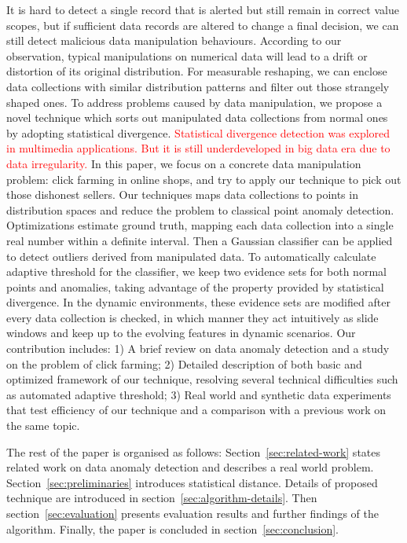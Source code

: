 \documentclass[10pt,conference,letterpaper]{article}
\begin{document}
		It is hard to detect a single record that is alerted but still remain in correct value scopes, but if sufficient data records are altered to change a final decision, we can still detect malicious data manipulation behaviours.
		According to our observation, typical manipulations on numerical data will lead to a drift or distortion of its original distribution. For measurable reshaping, we can enclose data collections with similar distribution patterns and filter out those strangely shaped ones. 
		To address problems caused by data manipulation, we propose a novel technique which sorts out manipulated data collections from normal ones by adopting statistical divergence.
		\textcolor{red}{Statistical divergence detection was explored in multimedia applications. But it is still underdeveloped in big data era due to data irregularity.}
		In this paper, we focus on a concrete data manipulation problem: click farming in online shops, and try to apply our technique to pick out those dishonest sellers.
		Our techniques maps data collections to points in distribution spaces and reduce the problem to classical point anomaly detection.
		Optimizations estimate ground truth, mapping each data collection into a single real number within a definite interval. Then a Gaussian classifier can be applied to detect outliers derived from manipulated data. To automatically calculate adaptive threshold for the classifier, we keep two evidence sets for both normal points and anomalies, taking advantage of the property provided by statistical divergence.
		In the dynamic environments, these evidence sets are modified after every data collection is checked, in which manner they act intuitively as slide windows and keep up to the evolving features in dynamic scenarios.
		Our contribution includes: 1) A brief review on data anomaly detection and a study on the problem of click farming; 2) Detailed description of both basic and optimized framework of our technique, resolving several technical difficulties such as automated adaptive threshold; 3) Real world and synthetic data experiments that test efficiency of our technique and a comparison with a previous work on the same topic.
		
		The rest of the paper is organised as follows: Section~\ref{sec:related-work} states related work on data anomaly detection and describes a real world problem. Section~\ref{sec:preliminaries} introduces statistical distance. Details of proposed technique are introduced in section~\ref{sec:algorithm-details}. Then section~\ref{sec:evaluation} presents evaluation results and further findings of the algorithm. Finally, the paper is concluded in section~\ref{sec:conclusion}.
		
\end{document}

